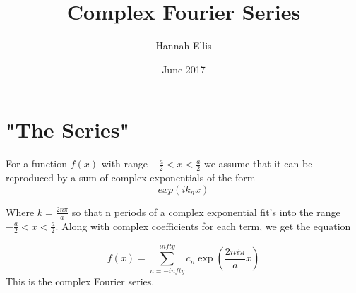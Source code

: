 \documentclass[11pt,twoside,a4paper]{article}
\begin{document}
\title{Complex Fourier Series}
\author{Hannah Ellis}
\date{June 2017}
\maketitle
\section{"The Series"}
For a function $f(x)$ with range $-\frac{a}{2}<x<\frac{a}{2}$ we assume that it can
be reproduced by a sum of complex exponentials of the form
\begin{equation}
exp(i k_n x)
\end{equation}

Where $k=\frac{2n\pi}{a}$ so that n periods of a complex exponential fit's into
the range $-\frac{a}{2}<x<\frac{a}{2}$. Along with complex coefficients for each
term, we get the equation

\begin{equation}
\label{eq:cfs}
f(x)=\sum_{n=-infty}^{infty} c_n \exp\left(\frac{2ni\pi}{a}x\right)
\end{equation}
This is the complex Fourier series.
\end{document}
